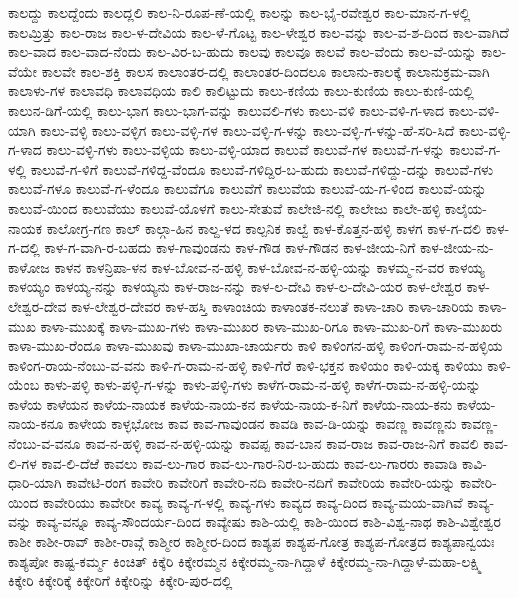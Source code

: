 ಕಾಲದ್ದು
ಕಾಲದ್ದೆಂದು
ಕಾಲದ್ಲಲಿ
ಕಾಲ-ನಿ-ರೂಪ-ಣೆ-ಯಲ್ಲಿ
ಕಾಲನ್ನು
ಕಾಲ-ಭೈ-ರವೇಶ್ವರ
ಕಾಲ-ಮಾನ-ಗ-ಳಲ್ಲಿ
ಕಾಲಮ್ರಿತ್ತು
ಕಾಲ-ರಾಜ
ಕಾಲ-ಳ-ದೇವಿಯ
ಕಾಲ-ಳೆ-ಗೊಟ್ಟ
ಕಾಲ-ಳೇಶ್ವರ
ಕಾಲ-ವನ್ನು
ಕಾಲ-ವ-ಶ-ದಿಂದ
ಕಾಲ-ವಾಗಿದೆ
ಕಾಲ-ವಾದ
ಕಾಲ-ವಾದ-ನೆಂದು
ಕಾಲ-ವಿರ-ಬ-ಹುದು
ಕಾಲವು
ಕಾಲವೂ
ಕಾಲವೆ
ಕಾಲ-ವೆಂದು
ಕಾಲ-ವೆ-ಯನ್ನು
ಕಾಲ-ವೆಯೇ
ಕಾಲವೇ
ಕಾಲ-ಶಕ್ತಿ
ಕಾಲಸ
ಕಾಲಾಂತರ-ದಲ್ಲಿ
ಕಾಲಾಂತರ-ದಿಂದಲೂ
ಕಾಲಾನು-ಕಾಲಕ್ಕೆ
ಕಾಲಾನುಕ್ರಮ-ವಾಗಿ
ಕಾಲಾಳು-ಗಳ
ಕಾಲಾವಧಿ
ಕಾಲಾವಧಿಯ
ಕಾಲಿ
ಕಾಲಿಟ್ಟುದು
ಕಾಲು-ಕಣಿಯ
ಕಾಲು-ಕುಣಿಯ
ಕಾಲು-ಕುಣಿ-ಯಲ್ಲಿ
ಕಾಲುನ-ಡಿಗೆ-ಯಲ್ಲಿ
ಕಾಲು-ಭಾಗ
ಕಾಲು-ಭಾಗ-ವನ್ನು
ಕಾಲುವಲಿ-ಗಳು
ಕಾಲು-ವಳಿ
ಕಾಲು-ವಳಿ-ಗ-ಳಾದ
ಕಾಲು-ವಳಿ-ಯಾಗಿ
ಕಾಲು-ವಳ್ಳಿ
ಕಾಲು-ವಳ್ಳಿಗ
ಕಾಲು-ವಳ್ಳಿ-ಗಳ
ಕಾಲು-ವಳ್ಳಿ-ಗ-ಳನ್ನು
ಕಾಲು-ವಳ್ಳಿ-ಗ-ಳನ್ನು-ಹೆ-ಸರಿ-ಸಿದೆ
ಕಾಲು-ವಳ್ಳಿ-ಗ-ಳಾದ
ಕಾಲು-ವಳ್ಳಿ-ಗಳು
ಕಾಲು-ವಳ್ಳಿಯ
ಕಾಲು-ವಳ್ಳಿ-ಯಾದ
ಕಾಲುವೆ
ಕಾಲುವೆ-ಗಳ
ಕಾಲುವೆ-ಗ-ಳನ್ನು
ಕಾಲುವೆ-ಗ-ಳಲ್ಲಿ
ಕಾಲುವೆ-ಗ-ಳಿಗೆ
ಕಾಲುವೆ-ಗಳಿದ್ದ-ವೆಂದೂ
ಕಾಲುವೆ-ಗಳಿದ್ದಿರ-ಬ-ಹುದು
ಕಾಲುವೆ-ಗಳಿದ್ದು-ದನ್ನು
ಕಾಲುವೆ-ಗಳು
ಕಾಲುವೆ-ಗಳೂ
ಕಾಲುವೆ-ಗ-ಳೆಂದೂ
ಕಾಲುವೆಗೂ
ಕಾಲುವೆಗೆ
ಕಾಲುವೆಯ
ಕಾಲುವೆ-ಯ-ಗ-ಳಿಂದ
ಕಾಲುವೆ-ಯನ್ನು
ಕಾಲುವೆ-ಯಿಂದ
ಕಾಲುವೆಯು
ಕಾಲುವೆ-ಯೊಳಗೆ
ಕಾಲು-ಸೇತುವೆ
ಕಾಲೇಜಿ-ನಲ್ಲಿ
ಕಾಲೇಜು
ಕಾಲೇ-ಹಳ್ಳಿ
ಕಾಲೈಯ-ನಾಯಕ
ಕಾಲೋಗ್ರ-ಗಣ
ಕಾಲ್
ಕಾಲ್ಗಾ-ಹಿನ
ಕಾಲ್ದ-ಳದ
ಕಾಲ್ಪನಿಕ
ಕಾಲ್ವೆ
ಕಾಳ-ಕೊತ್ತನ-ಹಳ್ಳಿ
ಕಾಳಗ
ಕಾಳ-ಗ-ದಲಿ
ಕಾಳ-ಗ-ದಲ್ಲಿ
ಕಾಳ-ಗ-ವಾಗಿ-ರ-ಬಹದು
ಕಾಳ-ಗಾವುಂಡನು
ಕಾಳ-ಗೌಡ
ಕಾಳ-ಗೌಡನ
ಕಾಳ-ಜೀಯ-ನಿಗೆ
ಕಾಳ-ಜೀಯ-ನು-ಕಾಳೋಜ
ಕಾಳನ
ಕಾಳನ್ರಿಪಾ-ಳನ
ಕಾಳ-ಬೋವ-ನ-ಹಳ್ಳಿ
ಕಾಳ-ಬೋವ-ನ-ಹಳ್ಳಿ-ಯನ್ನು
ಕಾಳಮ್ಮ-ನ-ವರ
ಕಾಳಯ್ಯ
ಕಾಳಯ್ಯಂ
ಕಾಳಯ್ಯ-ನನ್ನು
ಕಾಳಯ್ಯನು
ಕಾಳ-ರಾಜ-ನನ್ನು
ಕಾಳ-ಲ-ದೇವಿ
ಕಾಳ-ಲ-ದೇವಿ-ಯರ
ಕಾಳ-ಲೇಶ್ವರ
ಕಾಳ-ಲೇಶ್ವರ-ದೇವ
ಕಾಳ-ಲೇಶ್ವರ-ದೇವರ
ಕಾಳ-ಹಸ್ತಿ
ಕಾಳಾಂಚಿಯ
ಕಾಳಾಂತಕ-ನಲುತೆ
ಕಾಳಾ-ಚಾರಿ
ಕಾಳಾ-ಚಾರಿಯ
ಕಾಳಾ-ಮುಖ
ಕಾಳಾ-ಮುಖಕ್ಕೆ
ಕಾಳಾ-ಮುಖ-ಗಳು
ಕಾಳಾ-ಮುಖರ
ಕಾಳಾ-ಮುಖ-ರಿಗೂ
ಕಾಳಾ-ಮುಖ-ರಿಗೆ
ಕಾಳಾ-ಮುಖರು
ಕಾಳಾ-ಮುಖ-ರೆಂದೂ
ಕಾಳಾ-ಮುಖವು
ಕಾಳಾ-ಮುಖಾ-ಚಾರ್ಯರು
ಕಾಳಿ
ಕಾಳಿಂಗನ-ಹಳ್ಳಿ
ಕಾಳಿಂಗ-ರಾಮ-ನ-ಹಳ್ಳಿಯ
ಕಾಳಿಂಗ-ರಾಯ-ನೆಂಬು-ವ-ವನು
ಕಾಳಿ-ಗ-ರಾಮ-ನ-ಹಳ್ಳಿ
ಕಾಳಿ-ಗೆರೆ
ಕಾಳಿ-ಭಕ್ತನ
ಕಾಳಿಯಂ
ಕಾಳಿ-ಯಕ್ಕ
ಕಾಳಿಯು
ಕಾಳಿ-ಯೆಂಬ
ಕಾಳು-ಪಳ್ಳಿ
ಕಾಳು-ಪಳ್ಳಿ-ಗ-ಳನ್ನು
ಕಾಳು-ಪಳ್ಳಿ-ಗಳು
ಕಾಳೆಗ-ರಾಮ-ನ-ಹಳ್ಳಿ
ಕಾಳೆಗ-ರಾಮ-ನ-ಹಳ್ಳಿ-ಯನ್ನು
ಕಾಳೆಯ
ಕಾಳೆಯನ
ಕಾಳೆಯ-ನಾಯಕ
ಕಾಳೆಯ-ನಾಯ-ಕನ
ಕಾಳೆಯ-ನಾಯ-ಕ-ನಿಗೆ
ಕಾಳೆಯ-ನಾಯ-ಕನು
ಕಾಳೆಯ-ನಾಯ-ಕನೂ
ಕಾಳೇಯ
ಕಾಳ್ಳಭೋಜ
ಕಾವ
ಕಾವ-ಗಾವುಂಡನ
ಕಾವಡಿ
ಕಾವ-ಡಿ-ಯನ್ನು
ಕಾವಣ್ಣ
ಕಾವಣ್ಣನು
ಕಾವಣ್ಣ-ನೆಂಬು-ವ-ವನೂ
ಕಾವ-ನ-ಹಳ್ಳಿ
ಕಾವ-ನ-ಹಳ್ಳಿ-ಯನ್ನು
ಕಾವಪ್ಪ
ಕಾವ-ಬಾನ
ಕಾವ-ರಾಜ
ಕಾವ-ರಾಜ-ನಿಗೆ
ಕಾವಲಿ
ಕಾವ-ಲಿ-ಗಳ
ಕಾವ-ಲಿ-ದೆಱೆ
ಕಾವಲು
ಕಾವ-ಲು-ಗಾರ
ಕಾವ-ಲು-ಗಾರ-ನಿರ-ಬ-ಹುದು
ಕಾವ-ಲು-ಗಾರರು
ಕಾವಾಡಿ
ಕಾವಿ-ಧಾರಿ-ಯಾಗಿ
ಕಾವೇಟಿ-ರಂಗ
ಕಾವೇರಿ
ಕಾವೇರಿಗೆ
ಕಾವೇರಿ-ನದಿ
ಕಾವೇರಿ-ನದಿಗೆ
ಕಾವೇರಿಯ
ಕಾವೇರಿ-ಯನ್ನು
ಕಾವೇರಿ-ಯಿಂದ
ಕಾವೇರಿಯು
ಕಾವೇರೀ
ಕಾವ್ಯ
ಕಾವ್ಯ-ಗ-ಳಲ್ಲಿ
ಕಾವ್ಯ-ಗಳು
ಕಾವ್ಯದ
ಕಾವ್ಯ-ದಿಂದ
ಕಾವ್ಯ-ಮಯ-ವಾಗಿವೆ
ಕಾವ್ಯ-ವನ್ನು
ಕಾವ್ಯ-ವನ್ನೂ
ಕಾವ್ಯ-ಸೌಂದರ್ಯ-ದಿಂದ
ಕಾವ್ಯೇಷು
ಕಾಶಿ-ಯಲ್ಲಿ
ಕಾಶಿ-ಯಿಂದ
ಕಾಶಿ-ವಿಶ್ವ-ನಾಥ
ಕಾಶಿ-ವಿಶ್ವೇಶ್ವರ
ಕಾಶೀ
ಕಾಶೀ-ರಾವ್
ಕಾಶೀ-ರಾವ್ಗೆ
ಕಾಶ್ಮೀರ
ಕಾಶ್ಮೀರ-ದಿಂದ
ಕಾಶ್ಯಪ
ಕಾಶ್ಯಪ-ಗೋತ್ರ
ಕಾಶ್ಯಪ-ಗೋತ್ರದ
ಕಾಶ್ಯಪಾನ್ವಯಃ
ಕಾಶ್ಯಪೋ
ಕಾಷ್ಟ-ಕರ್ಮ್ಮ
ಕಿಂಚಿತ್
ಕಿಕ್ಕೆರಿ
ಕಿಕ್ಕೇರಮ್ಮನ
ಕಿಕ್ಕೇರಮ್ಮ-ನಾ-ಗಿದ್ದಾಳೆ
ಕಿಕ್ಕೇರಮ್ಮ-ನಾ-ಗಿದ್ದಾಳೆ-ಮಹಾ-ಲಕ್ಷ್ಮಿ
ಕಿಕ್ಕೇರಿ
ಕಿಕ್ಕೇರಿಕ್ಕೆ
ಕಿಕ್ಕೇರಿಗೆ
ಕಿಕ್ಕೇರಿನ್ನು
ಕಿಕ್ಕೇರಿ-ಪುರ-ದಲ್ಲಿ

